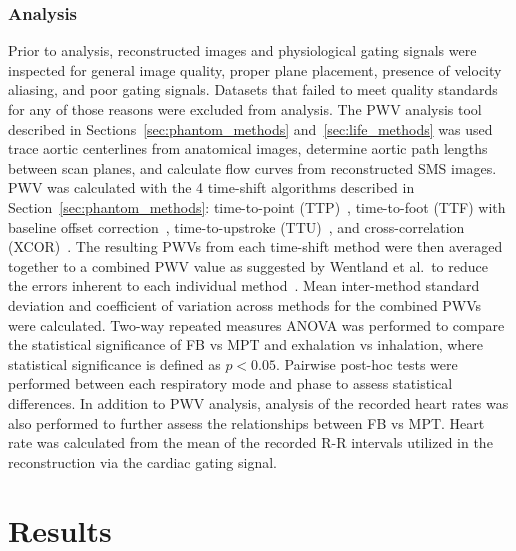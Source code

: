 \subsubsection{Analysis}
Prior to analysis, reconstructed images and physiological gating signals were inspected for general image quality, proper plane placement, presence of velocity aliasing, and poor gating signals. Datasets that failed to meet quality standards for any of those reasons were excluded from analysis. The PWV analysis tool described in Sections~\ref{sec:phantom_methods} and~\ref{sec:life_methods} was used trace aortic centerlines from anatomical images, determine aortic path lengths between scan planes, and calculate flow curves from reconstructed SMS images. PWV was calculated with the 4 time-shift algorithms described in Section~\ref{sec:phantom_methods}: time-to-point (TTP)~\cite{groeninkBiophysicalPropertiesNormalsized2001,doguiMeasurementAorticArch2011}, time-to-foot (TTF) with baseline offset correction~\cite{lundstromPulseWaveVelocity2022}, time-to-upstroke (TTU)~\cite{doguiMeasurementAorticArch2011}, and cross-correlation (XCOR)~\cite{fieldenNewMethodDetermination2008}. The resulting PWVs from each time-shift method were then averaged together to a combined PWV value as suggested by Wentland et al.\ to reduce the errors inherent to each individual method~\cite{wentlandReviewMRIbasedMeasurements2014}. Mean inter-method standard deviation and coefficient of variation across methods for the combined PWVs were calculated. Two-way repeated measures ANOVA was performed to compare the statistical significance of FB vs MPT and exhalation vs inhalation, where statistical significance is defined as $p < 0.05$. Pairwise post-hoc tests were performed between each respiratory mode and phase to assess statistical differences. In addition to PWV analysis, analysis of the recorded heart rates was also performed to further assess the relationships between FB vs MPT\@. Heart rate was calculated from the mean of the recorded R-R intervals utilized in the reconstruction via the cardiac gating signal.

\section{Results}\label{sec:sms_results}


